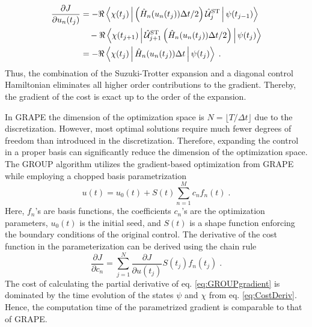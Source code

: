 \documentclass[%
 reprint,
 amsmath,amssymb,
 aps,
pra,
]{revtex4-1}
\begin{document}
\begin{align}
	\frac{\partial J}{\partial u_n (t_j)} &= - \Re \Braket{\chi (t_j) |  \left(  \hat{H}_n (u_n (t_j)) \Delta t /2 \right) \hat{\mathcal{U}}_{j}^{\mathrm{ST}} | \psi (t_{j-1})} \nonumber \\
	& \quad - \Re \Braket{\chi (t_{j+1}) | \hat{\mathcal{U}}_{j+1}^{\mathrm{ST}} \left(  \hat{H}_n (u_n (t_j)) \Delta t /2 \right) | \psi (t_{j})} \nonumber \\
	&= - \Re \Braket{\chi (t_j) | \hat{H}_n (u_n (t_j)) \Delta t | \psi (t_{j})} \; . \label{eq:STcostgrad}
\end{align}  
Thus, the combination of the Suzuki-Trotter expansion and a diagonal control Hamiltonian eliminates all higher order contributions to the gradient. Thereby, the gradient of the cost is exact up to the order of the expansion.

In GRAPE the dimension of the optimization space is $N = \lfloor T / \Delta t \rfloor$ due to the discretization. However, most optimal solutions require much fewer degrees of freedom than introduced in the discretization. Therefore, expanding the control in a proper basis can significantly reduce the dimension of the optimization space.
The GROUP algorithm utilizes the gradient-based optimization from GRAPE while employing a chopped basis parametrization 
\begin{equation}
	u(t) = u_0 (t) + S(t) \sum_{n=1}^{M} c_n f_n (t) \; . \label{eq:controlParametrization}
\end{equation}
Here, $f_n$'s are basis functions, the coefficients $c_n$'s are the optimization parameters, $u_0 (t)$ is the initial seed, and $S(t)$ is a shape function enforcing the boundary conditions of the original control. The derivative of the cost function in the parameterization can be derived using the chain rule
\begin{equation}
	\frac{\partial J }{\partial c_n} = \sum_{j = 1}^{N} \frac{\partial J }{\partial u(t_j)} S(t_j) f_n(t_j) \; . \label{eq:GROUPgradient} 
\end{equation}
The cost of calculating the partial derivative of eq. \eqref{eq:GROUPgradient} is dominated by the time evolution of the states $\psi$ and $\chi$ from eq. \eqref{eq:CostDeriv}. Hence, the computation time of the parametrized gradient is comparable to that of GRAPE.
\end{document}
